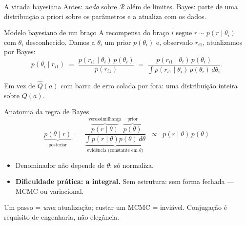 \documentclass[aspectratio=169, 11pt]{beamer}
\begin{document}
\begin{frame}{A virada bayesiana}
  Antes: \emph{nada} sobre $\mathcal{R}$ além de limites. Bayes: parte de
  uma distribuição \alert{a priori} sobre os parâmetros e a atualiza com
  os dados.

  \begin{defbox}{Modelo bayesiano de um braço}
    A recompensa do braço $i$ segue $r \sim p(r \mid \theta_i)$ com
    $\theta_i$ \alert{desconhecido}. Damos a $\theta_i$ um prior
    $p(\theta_i)$ e, observado $r_{i1}$, atualizamos por Bayes:
    \vspace{-0.6em}
    \[
      p(\theta_i \mid r_{i1})
      \;=\;
      \frac{p(r_{i1}\mid\theta_i)\,p(\theta_i)}{p(r_{i1})}
      \;=\;
      \frac{p(r_{i1}\mid\theta_i)\,p(\theta_i)}
           {\int p(r_{i1}\mid\theta_i)\,p(\theta_i)\,d\theta_i}.
    \]
    \vspace{-1.1em}
  \end{defbox}

  \begin{ideiabox}
    Em vez de $\hat{Q}(a)$ com barra de erro colada por fora: uma
    \alert{distribuição inteira} sobre $Q(a)$.
  \end{ideiabox}
\end{frame}

\begin{frame}{Anatomia da regra de Bayes}
  \[
    \underbrace{p(\theta \mid r)}_{\text{posterior}}
    \;=\;
    \frac{\;\overbrace{p(r \mid \theta)}^{\text{verossimilhança}}\;
          \overbrace{p(\theta)}^{\text{prior}}\;}
         {\underbrace{\textstyle\int p(r\mid\theta)p(\theta)\,d\theta}_{\text{evidência (constante em }\theta)}}
    \;\;\propto\;\;
    p(r \mid \theta)\, p(\theta)
  \]

  \begin{itemize}
    \item Denominador não depende de $\theta$: só normaliza.
    \item \textbf{Dificuldade prática: a integral.} Sem estrutura: sem
          forma fechada — MCMC ou variacional.
  \end{itemize}

  \begin{alertabox}
    Um passo = \emph{uma} atualização; custar um MCMC = inviável.
    Conjugação é \alert{requisito de engenharia}, não elegância.
  \end{alertabox}
\end{frame}
\end{document}
